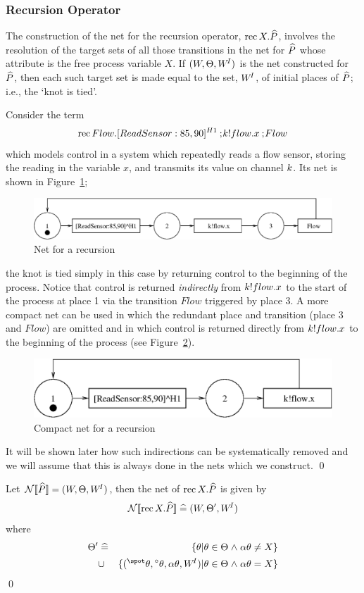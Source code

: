 \subsubsection{Recursion Operator}
The construction of the net for the recursion operator, $\mathrm{rec\,} X.{\widehat{P}}$,
involves the resolution of the target sets of all those transitions in the
net for ${\widehat{P}}$ whose attribute is the free process variable $X$. 
If $(W,\Theta,W^{\!I})$ is the net constructed for ${\widehat{P}}$, then each
such target set is made equal to the set, $W^{\!I}$, of initial places of
${\widehat{P}}$; i.e., the `knot is tied'.
\begin{exampleb}
Consider the term 
\[\mathrm{rec\,} Flow.[ReadSensor:85,90]^{H1} \mathbin{\mathrm{;}\!} {k}!flow.x \mathbin{\mathrm{;}\!} Flow\] which models control in a system
which repeatedly reads a flow sensor, storing the reading in the
variable $x$, and transmits its value on channel ${k}$. Its net is
shown in Figure~\ref{fig:recursionnet}; 
\begin{figure}[h]
\begin{center}
\includegraphics[width=.8\linewidth]{TGGEN/rec1.eps}
\end{center}
\caption{Net for a recursion\label{fig:recursionnet}}
\end{figure}
the knot is tied simply in
this case by returning control to the beginning of the process.
Notice that control is returned \emph{indirectly} from
${k}!flow.x$ to the start of the process at place 1 via the
transition $Flow$ triggered by place 3. A more compact net can
be used in which the redundant place and transition (place 3 and $Flow$) 
are omitted and in which control is returned directly from
${k}!flow.x$ to the beginning of the process (see
Figure~\ref{fig:recursionneta}). 
\begin{figure}[h]
\begin{center}
\includegraphics[width=.65\linewidth]{TGGEN/rec2.eps}
\end{center}
\caption{Compact net for a recursion\label{fig:recursionneta}}
\end{figure}
It will be shown later how such indirections can be systematically
removed and we will assume that this is always done in the nets which
we construct.
\qed
\end{exampleb}
\begin{definition}
Let ${\mathcal{N}[\![{\widehat{P}}]\!]} = (W,\Theta,W^{\!I})$, then the net of $\mathrm{rec\,} X.{\widehat{P}}$ is given by
\[ {\mathcal{N}[\![\mathrm{rec\,} X.{\widehat{P}}]\!]} \mathrel{\widehat=} (W,\Theta',W^{\!I}) \] where
\begin{eqnarray}
\T' & \defs & \{\tr | \tr \in \T \land \attr{\tr} \neq X\} \nonumber \\[.3mm]
  & \cup & \{(\preset{\tr},\vset{\tr},\attr{\tr},\WI) | \tr \in \T
                   \land \attr{\tr} = X\} \nonumber
\end{eqnarray}
\qed
\end{definition}

